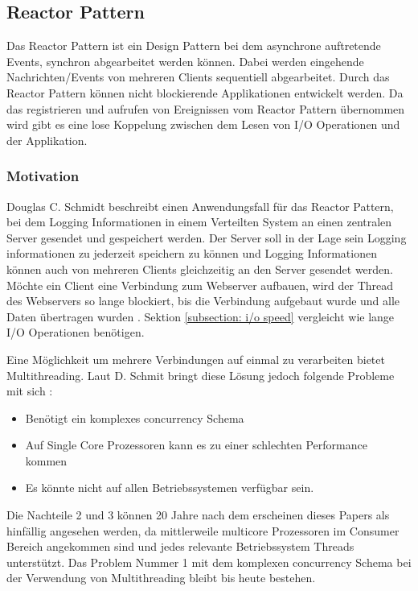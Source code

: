 \subsection{Reactor Pattern}
\label{section:Reactor Pattern}

Das Reactor Pattern ist ein Design Pattern bei dem asynchrone auftretende Events, synchron abgearbeitet werden können. Dabei werden eingehende Nachrichten/Events von mehreren Clients sequentiell abgearbeitet. Durch das Reactor Pattern können nicht blockierende Applikationen entwickelt werden. Da das registrieren und aufrufen von Ereignissen vom Reactor Pattern übernommen wird gibt es eine lose Koppelung zwischen dem Lesen von I/O Operationen und der Applikation. \cite[p. 1]{Sch95}


\subsubsection{Motivation}

Douglas C. Schmidt beschreibt einen Anwendungsfall für das Reactor Pattern, bei dem Logging Informationen in einem Verteilten System an einen zentralen Server gesendet und gespeichert werden. Der Server soll in der Lage sein Logging informationen zu jederzeit speichern zu können und Logging Informationen können auch von mehreren Clients gleichzeitig an den Server gesendet werden. Möchte ein Client eine Verbindung zum Webserver aufbauen, wird der Thread des Webservers so lange blockiert, bis die Verbindung aufgebaut wurde und alle Daten übertragen wurden \cite[p. 1]{Sch95}. Sektion \ref{subsection: i/o speed} vergleicht wie lange I/O Operationen benötigen.

Eine Möglichkeit um mehrere Verbindungen auf einmal zu verarbeiten bietet Multithreading. Laut D. Schmit bringt diese Lösung jedoch folgende Probleme mit sich \cite[p. 2]{Sch95}:

\begin{itemize}
  \item Benötigt ein komplexes concurrency Schema
  \item Auf Single Core Prozessoren kann es zu einer schlechten Performance kommen
  \item Es könnte nicht auf allen Betriebssystemen verfügbar sein.
\end{itemize}

Die Nachteile 2 und 3 können 20 Jahre nach dem erscheinen dieses Papers als hinfällig angesehen werden, da mittlerweile multicore Prozessoren im Consumer Bereich angekommen sind und jedes relevante Betriebssystem Threads unterstützt. Das Problem Nummer 1 mit dem komplexen concurrency Schema bei der Verwendung von Multithreading bleibt bis heute bestehen.

